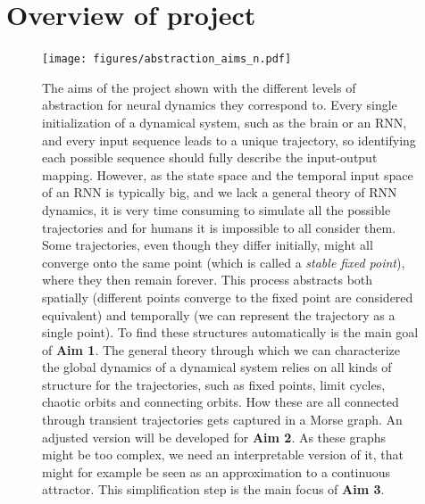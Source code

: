 \documentclass{article}
\newcounter{ct}
\theoremstyle{definition}
\theoremstyle{remark}
\begin{document}
\section{Overview of project}
\begin{figure}[H]
    \centering
    \texttt{[image: figures/abstraction\_aims\_n.pdf]}
    \caption{The aims of the project shown with the different levels of abstraction for neural dynamics they correspond to. 
    Every single initialization of a dynamical system, such as the brain or an RNN, and every input sequence leads to a unique trajectory, so identifying each possible sequence should fully describe the input-output mapping.
    However, as the state space and the temporal input space of an RNN is typically big, and we lack a general theory of RNN dynamics, it is very time consuming to simulate all the possible trajectories and for humans it is impossible to all consider them.
    Some trajectories, even though they differ initially, might all converge onto the same point (which is called a \emph{stable fixed point}), where they then remain forever.
    This process abstracts both spatially (different points converge to the fixed point are considered equivalent) and temporally (we can represent the trajectory as a single point). To find these structures automatically is the main goal of \textbf{Aim 1}.
    The general theory through which we can characterize the global dynamics of a dynamical system relies on all kinds of structure for the trajectories, such as fixed points, limit cycles, chaotic orbits and connecting orbits.
    How these are all connected through transient trajectories gets captured in a Morse graph. An adjusted version will be developed for \textbf{Aim 2}.
    As these graphs might be too complex, we need an interpretable version of it, that might for example be seen as an approximation to a continuous attractor. This simplification step is the main focus of \textbf{Aim 3}.
    }
    \label{fig:abstraction_aims}
\end{figure}



\end{document}
